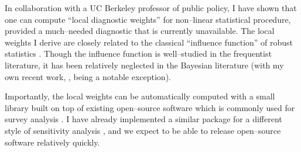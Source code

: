 In collaboration with a UC Berkeley professor of public policy, I have shown
that one can compute ``local diagnostic weights'' for non--linear statistical
procedure, provided a much--needed diagnostic that is currently unavailable. The
local weights I derive are closely related to the classical ``influence
function'' of robust statistics
\citep{mises:1947:asymptotic,hampel:1986:robust,giordano:2019:swiss}.  Though
the influence function is well--studied in the frequentist literature, it has
been relatively neglected in the Bayesian literature (with my own recent work,
\citet{giordano:2023:bayesij}, being a notable exception).

Importantly, the local weights can be automatically computed with a small
library built on top of existing open--source software which is commonly used
for survey analysis \citep{lopezmartin:2022:mrptutorial}.  I have already
implemented a similar package for a different style of sensitivity analysis
\citep{giordano:2020:amip,giordano:2024:zaminfluence}, and we expect to be able
to release open--source software relatively quickly.  








